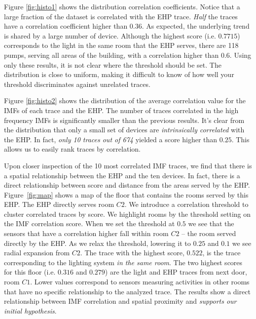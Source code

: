 Figure \ref{fig:histo1} shows the distribution correlation coefficients.  Notice
that a large fraction of the dataset is correlated with the EHP trace.
\emph{Half} the traces have a correlation coefficient higher than $0.36$.  As expected, the underlying
trend is shared by a large number of device.
Although the highest score (i.e. $0.7715$) corresponds to the light in the same room that the EHP serves,
there are 118 pumps, serving all areas of the building, with a correlation higher than $0.6$.
Using only these results, it is not clear where the threshold should be set.  The distribution is close to 
uniform, making it difficult to 
know of how well your threshold discriminates against unrelated traces.

Figure \ref{fig:histo2} shows the distribution of the average correlation value for the IMFs of
each trace and the EHP.  The number of traces correlated in the high frequency IMFs is significantly smaller
than the previous results. It's clear from the distribution that only a small set of devices are
\emph{intrinsically correlated} with the EHP.  In fact, \emph{only 10 traces out of 674} yielded a score higher than 
$0.25$. This allows us to easily rank traces by correlation.

Upon closer inspection of the 10 most correlated IMF traces, we find that there is a spatial relationship
between the EHP and the ten devices.  In fact, there is a direct relationship between score and distance from
the areas served by the EHP.  Figure~\ref{fig:map} shows a map of the floor that contains the rooms served by this
EHP.  The EHP directly serves room $C2$.  We introduce a correlation threshold to cluster correlated traces by score.
We highlight rooms by the threshold setting on the IMF correlation score.
When we set the threshold at $0.5$ we see that the sensors that have a correlation higher fall within room $C2$ --
the room served directly by the EHP.  As we relax the threshold, lowering it to $0.25$ and $0.1$ we see radial expansion from $C2$.  The trace with the highest score, $0.522$, is the trace corresponding to the lighting system \emph{in
the same room}.
The two highest scores for this floor (i.e. $0.316$ and $0.279$) are the light and EHP traces from next door, room $C1$.
Lower values correspond to sensors measuring activities in other rooms that have no specific relationship to the analyzed trace.  The results show a direct relationship between IMF correlation and spatial proximity and \emph{supports our initial
hypothesis}.




